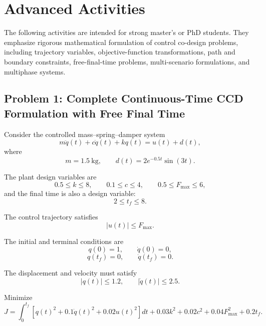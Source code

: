 
\section{Advanced Activities}

The following activities are intended for strong master's or PhD students.
They emphasize rigorous mathematical formulation of control co-design
problems, including trajectory variables, objective-function transformations,
path and boundary constraints, free-final-time problems, multi-scenario
formulations, and multiphase systems.

\subsection*{Problem 1: Complete Continuous-Time CCD Formulation with Free Final Time}

Consider the controlled mass--spring--damper system
\begin{equation}
m\ddot{q}(t)+c\dot{q}(t)+kq(t)=u(t)+d(t),
\end{equation}
where
\begin{equation}
m=1.5~\mathrm{kg},
\qquad
d(t)=2e^{-0.5t}\sin(3t).
\end{equation}

The plant design variables are
\begin{equation}
0.5\leq k\leq 8,
\qquad
0.1\leq c\leq 4,
\qquad
0.5\leq F_{\max}\leq 6,
\end{equation}
and the final time is also a design variable:
\begin{equation}
2\leq t_f\leq 8.
\end{equation}

The control trajectory satisfies
\begin{equation}
|u(t)|\leq F_{\max}.
\end{equation}

The initial and terminal conditions are
\begin{equation}
q(0)=1,
\qquad
\dot{q}(0)=0,
\end{equation}
\begin{equation}
q(t_f)=0,
\qquad
\dot{q}(t_f)=0.
\end{equation}

The displacement and velocity must satisfy
\begin{equation}
|q(t)|\leq 1.2,
\qquad
|\dot{q}(t)|\leq 2.5.
\end{equation}

Minimize
\begin{equation}
J
=
\int_0^{t_f}
\left[
q(t)^2
+
0.1\dot{q}(t)^2
+
0.02u(t)^2
\right]dt
+
0.03k^2
+
0.02c^2
+
0.04F_{\max}^2
+
0.2t_f.
\end{equation}

